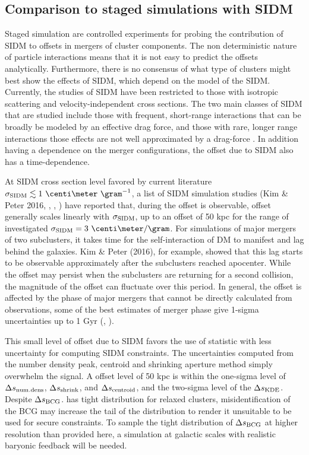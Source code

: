   
\subsection{Comparison to staged simulations with SIDM}
\label{subsec:SIDM_sim}
Staged simulation are controlled experiments for probing the contribution
of SIDM to offsets in mergers of cluster components. 
The non deterministic nature of particle interactions means that it is not easy
to predict the offsets analytically.
Furthermore, there is no consensus of what type of clusters might best show the
effects of SIDM, which depend on the model of the SIDM.
Currently, the studies of SIDM have been restricted to those with isotropic
scattering and velocity-independent cross sections.   
The two main classes of SIDM that are studied include those with 
frequent, short-range interactions that can be broadly be modeled by an
effective drag force, and those with rare, longer range interactions those
effects are not well approximated by a drag-force \citep{Kahlhoefer14}. 
In addition having a dependence on the merger configurations, the offset due to
SIDM also has a time-dependence.    

At SIDM cross section level favored by current literature $\sigma_{\rm SIDM}
\lesssim 1~\centi\meter ~\gram^{-1}$, a list of SIDM simulation studies (Kim \&
Peter 2016, \citealt{Robertson2016}, \citealt{Kahlhoefer14}, \citealt{Randall2008d})
have reported that, during the offset is observable, 
offset generally scales linearly with $\sigma_{\rm SIDM}$,  
up to an offset of 50 kpc for the range of investigated $\sigma_{\rm SIDM} = 3
~\centi\meter / \gram$.
For simulations of major mergers of two subclusters, it takes time for the self-interaction of DM
to manifest and lag behind the galaxies. Kim \& Peter (2016), for example, showed that
this lag starts to be observable approximately after the subclusters reached apocenter. 
While the offset may persist when the subclusters are returning for a
second collision, the magnitude of the offset can fluctuate over this period.
In general, the offset is affected by the phase of major mergers that cannot be
directly calculated from observations, some of the best estimates of merger phase 
give 1-sigma uncertainties up
to 1 Gyr (\citealt{D13}, \citealt{Ng2014}).

This small level of offset due to SIDM favors the use of statistic 
with less uncertainty for computing SIDM constraints. 
The uncertainties computed from the number density peak, centroid and shrinking
aperture method simply overwhelm the signal. 
A offset level of 50 kpc is within the one-sigma level of $\Delta s_{\rm num.
dens}$, $\Delta s_{\rm shrink}$, and $\Delta s_{\rm centroid}$, and the two-sigma
level of the $\Delta s_{\rm KDE}$. 
 Despite $\Delta s_{\rm BCG}$. 
 has tight distribution for relaxed clusters, misidentification of the BCG 
may increase the tail of the distribution to render it unsuitable to be used 
for secure constraints. To sample the tight distribution of $\Delta s_{\rm
BCG}$ at higher
resolution than provided here, a simulation at galactic scales with realistic
baryonic feedback will be needed. 


